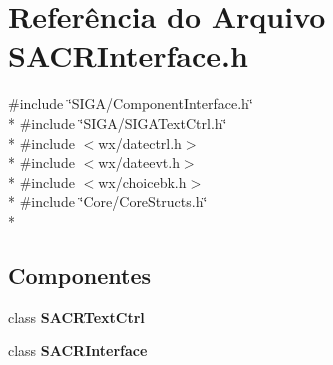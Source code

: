 \section{Referência do Arquivo S\+A\+C\+R\+Interface.\+h}
\label{_s_a_c_r_interface_8h}
{\ttfamily \#include \char`\"{}S\+I\+G\+A/\+Component\+Interface.\+h\char`\"{}}\\*
{\ttfamily \#include \char`\"{}S\+I\+G\+A/\+S\+I\+G\+A\+Text\+Ctrl.\+h\char`\"{}}\\*
{\ttfamily \#include $<$wx/datectrl.\+h$>$}\\*
{\ttfamily \#include $<$wx/dateevt.\+h$>$}\\*
{\ttfamily \#include $<$wx/choicebk.\+h$>$}\\*
{\ttfamily \#include \char`\"{}Core/\+Core\+Structs.\+h\char`\"{}}\\*
\subsection*{Componentes}
\begin{DoxyCompactItemize}
\item 
class {\bf S\+A\+C\+R\+Text\+Ctrl}
\item 
class {\bf S\+A\+C\+R\+Interface}
\end{DoxyCompactItemize}
